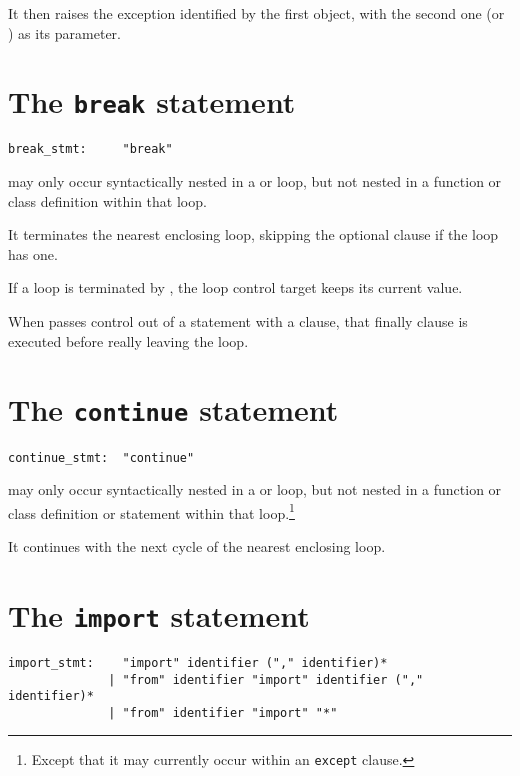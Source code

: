 It then raises the exception identified by the first object,
with the second one (or \verb@None@) as its parameter.

\section{The {\tt break} statement}

\begin{verbatim}
break_stmt:     "break"
\end{verbatim}

\verb@break@ may only occur syntactically nested in a \verb@for@
or \verb@while@ loop, but not nested in a function or class definition
within that loop.

It terminates the nearest enclosing loop, skipping the optional
\verb@else@ clause if the loop has one.

If a \verb@for@ loop is terminated by \verb@break@, the loop control
target keeps its current value.

When \verb@break@ passes control out of a \verb@try@ statement
with a \verb@finally@ clause, that finally clause is executed
before really leaving the loop.

\section{The {\tt continue} statement}

\begin{verbatim}
continue_stmt:  "continue"
\end{verbatim}

\verb@continue@ may only occur syntactically nested in a \verb@for@ or
\verb@while@ loop, but not nested in a function or class definition or
\verb@try@ statement within that loop.\footnote{Except that it may
currently occur within an {\tt except} clause.}

It continues with the next cycle of the nearest enclosing loop.

\section{The {\tt import} statement} \label{import}

\begin{verbatim}
import_stmt:    "import" identifier ("," identifier)*
              | "from" identifier "import" identifier ("," identifier)*
              | "from" identifier "import" "*"
\end{verbatim}

